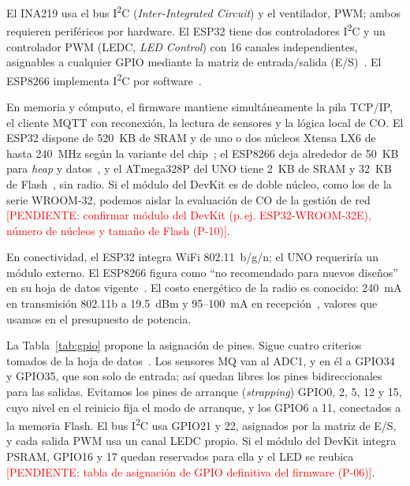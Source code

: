 \documentclass[manuscript,screen,nonacm,natbib=false]{acmart}
\newcommand{\pendiente}[1]{\textcolor{red}{[PENDIENTE: #1]}}
\newcommand{\IIC}{I\textsuperscript{2}C}
\begin{document}
El INA219 usa el bus \IIC{} (\textit{Inter-Integrated Circuit}) y el ventilador, PWM; ambos requieren periféricos por hardware. El ESP32 tiene dos controladores \IIC{} y un controlador PWM (LEDC, \textit{LED Control}) con 16 canales independientes, asignables a cualquier GPIO mediante la matriz de entrada/salida (E/S)~\cite{espressif2026esp32}. El ESP8266 implementa \IIC{} por software~\cite{espressif2025esp8266}.

En memoria y cómputo, el firmware mantiene simultáneamente la pila TCP/IP, el cliente MQTT con reconexión, la lectura de sensores y la lógica local de CO. El ESP32 dispone de 520~KB de SRAM y de uno o dos núcleos Xtensa LX6 de hasta 240~MHz según la variante del chip~\cite{espressif2026esp32}; el ESP8266 deja alrededor de 50~KB para \textit{heap} y datos~\cite{espressif2025esp8266}, y el ATmega328P del UNO tiene 2~KB de SRAM y 32~KB de Flash~\cite{microchip2018atmega328p}, sin radio. Si el módulo del DevKit es de doble núcleo, como los de la serie WROOM-32, podemos aislar la evaluación de CO de la gestión de red \pendiente{confirmar módulo del DevKit (p.\,ej. ESP32-WROOM-32E), número de núcleos y tamaño de Flash (P-10)}.

En conectividad, el ESP32 integra WiFi 802.11~b/g/n; el UNO requeriría un módulo externo. El ESP8266 figura como ``no recomendado para nuevos diseños'' en su hoja de datos vigente~\cite{espressif2025esp8266}. El costo energético de la radio es conocido: 240~mA en transmisión 802.11b a 19.5~dBm y 95--100~mA en recepción~\cite{espressif2026esp32}, valores que usamos en el presupuesto de potencia.

La Tabla~\ref{tab:gpio} propone la asignación de pines. Sigue cuatro criterios tomados de la hoja de datos~\cite{espressif2026esp32}. Los sensores MQ van al ADC1, y en él a GPIO34 y GPIO35, que son solo de entrada; así quedan libres los pines bidireccionales para las salidas. Evitamos los pines de arranque (\textit{strapping}) GPIO0, 2, 5, 12 y 15, cuyo nivel en el reinicio fija el modo de arranque, y los GPIO6 a 11, conectados a la memoria Flash. El bus \IIC{} usa GPIO21 y 22, asignados por la matriz de E/S, y cada salida PWM usa un canal LEDC propio. Si el módulo del DevKit integra PSRAM, GPIO16 y 17 quedan reservados para ella y el LED se reubica \pendiente{tabla de asignación de GPIO definitiva del firmware (P-06)}.
\end{document}
